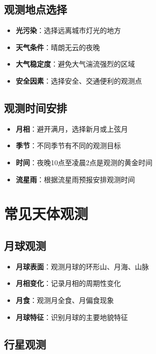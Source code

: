 \documentclass[12pt,UTF8]{ctexbook}
\begin{document}
\subsection{观测地点选择}

\begin{itemize}
  \item \textbf{光污染}：选择远离城市灯光的地方
  \item \textbf{天气条件}：晴朗无云的夜晚
  \item \textbf{大气稳定度}：避免大气湍流强烈的区域
  \item \textbf{安全因素}：选择安全、交通便利的观测点
\end{itemize}

\subsection{观测时间安排}

\begin{itemize}
  \item \textbf{月相}：避开满月，选择新月或上弦月
  \item \textbf{季节}：不同季节有不同的观测目标
  \item \textbf{时间}：夜晚10点至凌晨2点是观测的黄金时间
  \item \textbf{流星雨}：根据流星雨预报安排观测时间
\end{itemize}

\section{常见天体观测}

\subsection{月球观测}

\begin{itemize}
  \item \textbf{月球表面}：观测月球的环形山、月海、山脉
  \item \textbf{月相变化}：记录月相的周期性变化
  \item \textbf{月食}：观测月全食、月偏食现象
  \item \textbf{月球特征}：识别月球的主要地貌特征
\end{itemize}

\subsection{行星观测}
\end{document}
